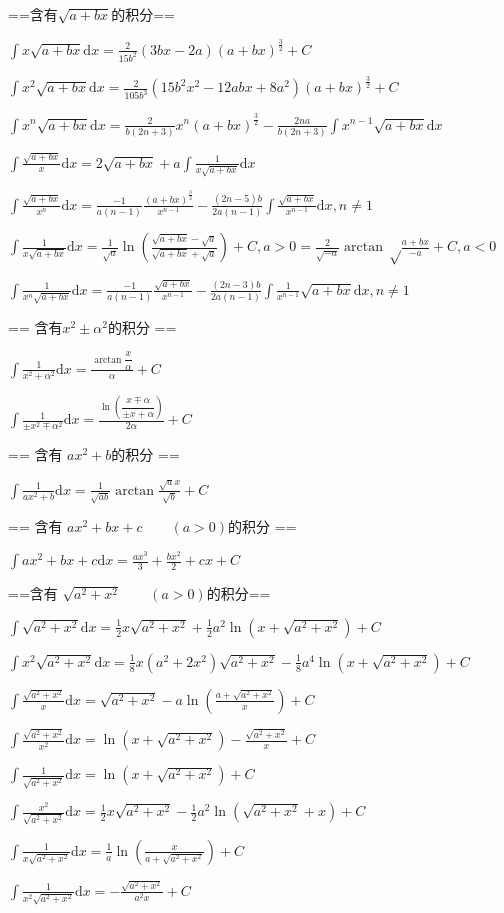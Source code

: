 ==含有$\sqrt{a+bx}$的积分==\par
$\int x\sqrt{a+bx}\mbox{d}x=\frac{2}{15b^2}(3bx-2a)(a+bx)^{\frac{3}{2}}+C$\par
$\int x^2\sqrt{a+bx}\mbox{d}x=\frac{2}{105b^3}(15b^2x^2-12abx+8a^2)(a+bx)^{\frac{3}{2}}+C$\par
$\int x^n\sqrt{a+bx}\mbox{d}x=\frac{2}{b(2n+3)}x^n(a+bx)^{\frac{3}{2}} -\frac{2na}{b(2n+3)}\int x^{n-1}\sqrt{a+bx}\mbox{d}x$\par
$\int\frac{\sqrt{a+bx}}{x}\mbox{d}x=2\sqrt{a+bx}+a\int\frac{1}{x\sqrt{a+bx}}\mbox{d}x$\par
$\int\frac{\sqrt{a+bx}}{x^n}\mbox{d}x=\frac{-1}{a(n-1)}\frac{(a+bx)^{\frac{3}{2}}}{x^{n-1}} -\frac{(2n-5)b}{2a(n-1)}\int\frac{\sqrt{a+bx}}{x^{n-1}}\mbox{d}x,n\neq 1$\par
$\int\frac{1}{x\sqrt{a+bx}}\mbox{d}x=\frac{1}{\sqrt{a}}\ln\left (\frac{\sqrt{a+bx} -\sqrt{a}}{\sqrt{a+bx}+\sqrt{a}}\right )+C,a>0
=\frac{2}{\sqrt{-a}}\arctan\sqrt\frac{a+bx}{-a} +C,a<0$\par
$\int\frac{1}{x^n\sqrt{a+bx}}\mbox{d}x=\frac{-1}{a(n-1)}\frac{\sqrt{a+bx}}{x^{n-1}} -\frac{(2n-3)b}{2a(n-1)}\int\frac{1}{x^{n-1}}\sqrt{a+bx}\mbox{d}x,n\neq 1$\par
== 含有$x^2\pm\alpha^2$的积分 ==\par
$\int\frac{1}{x^2+\alpha^2}\mbox{d}x=\frac{\arctan\dfrac{x}{\alpha}}{\alpha}+C$\par
$\int\frac{1}{\pm x^2\mp\alpha^2}\mbox{d}x = \frac{\ln\left(\dfrac{x\mp\alpha}{\pm x+\alpha}\right)}{2\alpha}+C$\par
== 含有 ${ax^2+b}$的积分 ==\par
$\int\frac{1}{ax^2+b}\mbox{d}x=\frac{1}{\sqrt{ab}} \arctan\frac{\sqrt{a}x}{\sqrt{b}}+C$\par
== 含有 $ax^2+bx+c\qquad(a>0)$的积分 ==\par
$\int ax^2+bx+c\mbox{d}x=\frac{ax^3}{3}+\frac{bx^2}{2}+cx+C$\par
==含有 $\sqrt{a^2+x^2}\qquad(a>0)$的积分==\par
$\int\sqrt{a^2+x^2}\mbox{d}x=\frac{1}{2}x\sqrt{a^2+x^2}+\frac{1}{2}a^2\ln\left (x+\sqrt{a^2+x^2}\right )+C$\par
$\int x^2\sqrt{a^2+x^2}\mbox{d}x=\frac{1}{8}x(a^2+2x^2)\sqrt{a^2+x^2}-\frac{1}{8}a^4\ln\left (x+\sqrt{a^2+x^2}\right )+C$\par
$\int \frac{\sqrt{a^2+x^2}}{x}\mbox{d}x = \sqrt{a^2+x^2} - a\ln \left ( \frac{a+\sqrt{a^2+x^2}}{x} \right ) +C$\par
$\int \frac{\sqrt{a^2+x^2}}{x^2}\mbox{d}x = \ln\left ( x+\sqrt{a^2+x^2}\right ) -  \frac{\sqrt{a^2+x^2}}{x} +C$\par
$\int \frac{1}{\sqrt{a^2+x^2}}\mbox{d}x=\ln \left ( x+\sqrt{a^2+x^2} \right ) +C$\par
$\int\frac{x^2}{\sqrt{a^2+x^2}}\mbox{d}x=\frac{1}{2}x\sqrt{a^2+x^2} -\frac{1}{2}a^2\ln\left (\sqrt{a^2+x^2}+x \right )+C$\par
$\int\frac{1}{x\sqrt{a^2+x^2}}\mbox{d}x=\frac{1}{a}\ln\left (\frac{x}{a+\sqrt{a^2+x^2}}\right )+C$\par
$\int\frac{1}{x^2\sqrt{a^2+x^2}}\mbox{d}x=-\frac{\sqrt{a^2+x^2}}{a^2x}+C$\par

